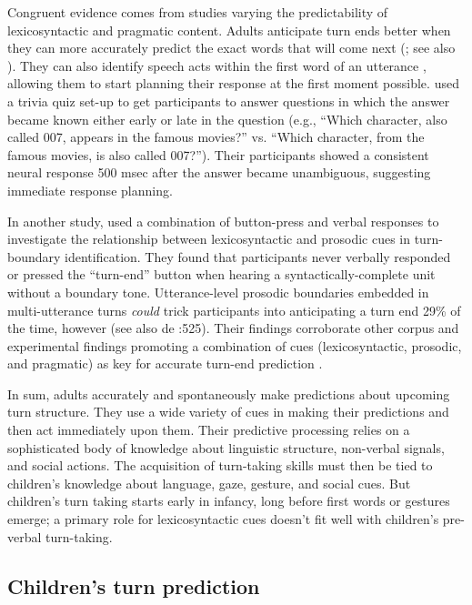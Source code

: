 \documentclass[authoryear, 12pt]{elsarticle}
\begin{document}
Congruent evidence comes from studies varying the predictability of lexicosyntactic and pragmatic content. Adults anticipate turn ends better when they can more accurately predict the exact words that will come next (\citealp{magyari2012}; see also \citealp{magyariUndRev}). They can also identify speech acts within the first word of an utterance \citep{gisladottirUndRev}, allowing them to start planning their response at the first moment possible. \citet*{bogelsmagyariInPrep} used a trivia quiz set-up to get participants to answer questions in which the answer became known either early or late in the question (e.g., ``Which character, also called 007, appears in the famous movies?'' vs. ``Which character, from the famous movies, is also called 007?''). Their participants showed a consistent neural response 500 msec after the answer became unambiguous, suggesting immediate response planning.

In another study, \citet*{torreiraUndRev} used a combination of button-press and verbal responses to investigate the relationship between lexicosyntactic and prosodic cues in turn-boundary identification. They found that participants never verbally responded or pressed the ``turn-end'' button when hearing a syntactically-complete unit without a boundary tone. Utterance-level prosodic boundaries embedded in multi-utterance turns \textit{could} trick participants into anticipating a turn end 29\% of the time, however (see also de \citet{de-ruiter2006}:525). Their findings corroborate other corpus and experimental findings promoting a combination of cues (lexicosyntactic, prosodic, and pragmatic) as key for accurate turn-end prediction \citep{duncan1972, ford1996, hirvenkari2013}.

In sum, adults accurately and spontaneously make predictions about upcoming turn structure. They use a wide variety of cues in making their predictions and then act immediately upon them. Their predictive processing relies on a sophisticated body of knowledge about linguistic structure, non-verbal signals, and social actions. The acquisition of turn-taking skills must then be tied to children's knowledge about language, gaze, gesture, and social cues. But children's turn taking starts early in infancy, long before first words or gestures emerge; a primary role for lexicosyntactic cues doesn't fit well with children's pre-verbal turn-taking. 

\subsection{Children's turn prediction}
\end{document}
